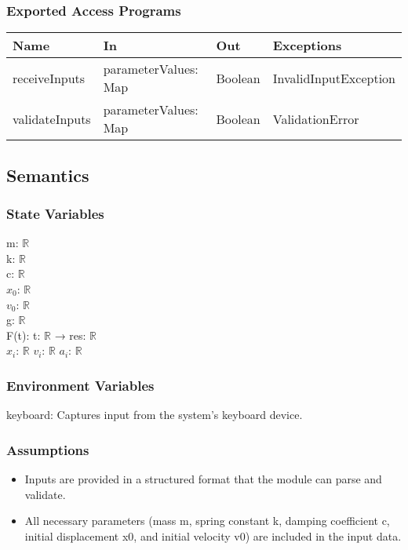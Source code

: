 \documentclass[12pt, titlepage]{article}
\begin{document}
\subsubsection{Exported Access Programs}

\begin{center}
\begin{tabular}{p{4cm} p{4cm} p{4cm} p{4cm}}
\hline
\textbf{Name} & \textbf{In} & \textbf{Out} & \textbf{Exceptions} \\
\hline
receiveInputs & parameterValues: Map & Boolean & InvalidInputException \\
validateInputs & parameterValues: Map & Boolean & ValidationError \\
\hline
\end{tabular}
\end{center}

\subsection{Semantics}

\subsubsection{State Variables}
m: $\mathbb{R}$\\
k: $\mathbb{R}$\\
c: $\mathbb{R}$\\
$x_0$: $\mathbb{R}$\\
$v_0$: $\mathbb{R}$\\
g: $\mathbb{R}$\\
F(t): t: $\mathbb{R}$ → res: $\mathbb{R}$\\ %
$x_i$: $\mathbb{R}$
$v_i$: $\mathbb{R}$
$a_i$: $\mathbb{R}$

\subsubsection{Environment Variables}

keyboard: Captures input from the system's keyboard device.

\subsubsection{Assumptions}

\begin{itemize}
  \item Inputs are provided in a structured format that the module can parse and validate.
  \item All necessary parameters (mass m, spring constant k, damping coefficient c, initial displacement x0, and initial velocity v0) are included in the input data.
\end{itemize}
\end{document}

